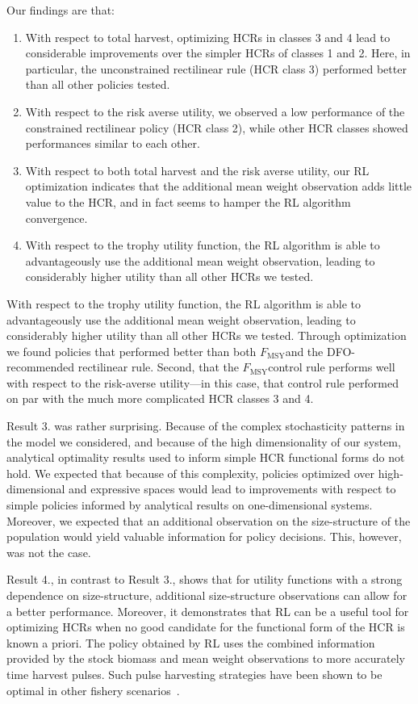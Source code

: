 \documentclass[floatfix,nofootinbib,longbibliography,notitlepage]{revtex4-1}
\def\textfmsy{$F_{\text{MSY}}$}
\begin{document}
Our findings are that:
\begin{enumerate}
\item With respect to total harvest, optimizing HCRs in classes 3 and 4 lead to considerable improvements over the simpler HCRs of classes 1 and 2. Here, in particular, the unconstrained rectilinear rule (HCR class 3) performed better than all other policies tested.
\item With respect to the risk averse utility, we observed a low performance of the constrained rectilinear policy (HCR class 2), while other HCR classes showed performances similar to each other.
\item With respect to both total harvest and the risk averse utility, our RL optimization indicates that the additional mean weight observation adds little value to the HCR, and in fact seems to hamper the RL algorithm convergence. 
\item With respect to the trophy utility function, the RL algorithm is able to advantageously use the additional mean weight observation, leading to considerably higher utility than all other HCRs we tested. 
\end{enumerate}

With respect to the trophy utility function, the RL algorithm is able to advantageously use the additional mean weight observation, leading to considerably higher utility than all other HCRs we tested. 
Through optimization we found policies that performed better than both \textfmsy and the DFO-recommended rectilinear rule. 
Second, that the \textfmsy control rule performs well with respect to the risk-averse utility—in this case, that control rule performed on par with the much more complicated HCR classes 3 and 4. 

Result 3. was rather surprising. 
Because of the complex stochasticity patterns in the model we considered, and because of the high dimensionality of our system, analytical optimality results used to inform simple HCR functional forms do not hold. 
We expected that because of this complexity, policies optimized over high-dimensional and expressive spaces would lead to improvements with respect to simple policies informed by analytical results on one-dimensional systems. 
Moreover, we expected that an additional observation on the size-structure of the population would yield valuable information for policy decisions. 
This, however, was not the case.

Result 4., in contrast to Result 3., shows that for utility functions with a strong dependence on size-structure, additional size-structure observations can allow for a better performance. 
Moreover, it demonstrates that RL can be a useful tool for optimizing HCRs when no good candidate for the functional form of the HCR is known a priori. 
The policy obtained by RL uses the combined information provided by the stock biomass and mean weight observations to more accurately time harvest pulses. Such pulse harvesting strategies have been shown to be optimal in other fishery scenarios~\cite{botsford1981,darocha2013}.
\end{document}
